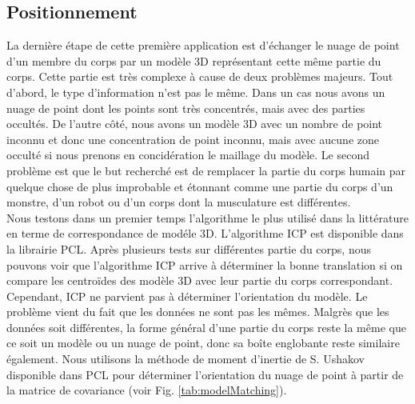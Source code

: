 \subsection{Positionnement}
La dernière étape de cette première application est d'échanger le nuage de point d'un membre du corps par un modèle 3D représentant cette même partie
du corps. Cette partie est très complexe à cause de deux problèmes majeurs. Tout d'abord, le type d'information n'est pas le même. Dans un cas nous avons
un nuage de point dont les points sont très concentrés, mais avec des parties occultés. De l'autre côté, nous avons un modèle 3D avec un nombre de point
inconnu et donc une concentration de point inconnu, mais avec aucune zone occulté si nous prenons en concidération le maillage du modèle. Le second problème
est que le but recherché est de remplacer la partie du corps humain par quelque chose de plus improbable et étonnant comme une partie du corps d'un monstre,
d'un robot ou d'un corps dont la musculature est différentes.\\

Nous testons dans un premier temps l'algorithme le plus utilisé dans la littérature en terme de correspondance de modéle 3D. L'algorithme ICP\cite{ICP} est
disponible dans la librairie PCL\cite{PCL}. Après plusieurs tests sur différentes partie du corps, nous pouvons voir que l'algorithme ICP arrive à déterminer
la bonne translation si on compare les centroïdes des modèle 3D avec leur partie du corps correspondant. Cependant, ICP ne parvient pas à déterminer
l'orientation du modèle. Le problème vient du fait que les données ne sont pas les mêmes. Malgrès que les données soit différentes, la forme général
d'une partie du corps reste la même que ce soit un modèle ou un nuage de point, donc sa boîte englobante reste similaire également. Nous utilisons la méthode
de moment d'inertie de S. Ushakov disponible dans PCL pour déterminer l'orientation du nuage de point à partir de la matrice de covariance
(voir Fig. \ref{tab:modelMatching}).\\

